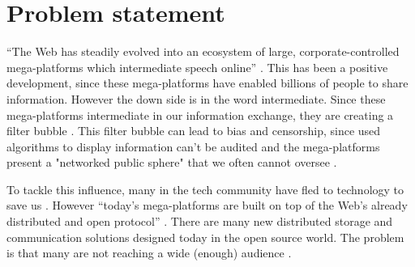\documentclass{article}
\begin{document}
\tableofcontents

%  
%  
%  

\section{Problem statement}
``The Web has steadily evolved into an ecosystem of large, corporate-controlled mega-platforms which intermediate speech online'' \cite{mit_techreport}. 
This has been a positive development, since these mega-platforms have enabled billions of people to share information. However the down side is in the word intermediate. Since these mega-platforms intermediate in our information exchange, they are creating a filter bubble \cite{Pariser:2011:FBI:2029079}. This filter bubble can lead to bias and censorship, since used algorithms to display information can't be audited and the mega-platforms present a "networked public sphere" that we often cannot oversee \cite{mit_techreport}. 

To tackle this influence, many in the tech community have fled to technology to save us \cite{save_internet}. However ``today’s mega-platforms are built on top of the Web’s already distributed and open protocol'' \cite{mit_techreport}. There are many new distributed storage and communication solutions designed today in the open source world. The problem is that many are not reaching a wide (enough) audience \cite{mit_techreport}.
\end{document}
